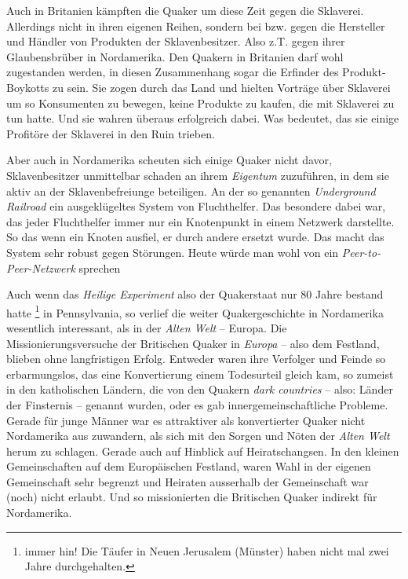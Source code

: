 \medskip

Auch in Britanien kämpften die Quaker um diese Zeit gegen die Sklaverei.
Allerdings nicht in ihren eigenen Reihen, sondern bei bzw. gegen die Hersteller
und Händler von Produkten der Sklavenbesitzer. Also z.T. gegen ihrer
Glaubensbrüber in Nordamerika. Den Quakern in Britanien darf wohl zugestanden
werden, in diesen Zusammenhang sogar die Erfinder des Produkt-Boykotts zu sein.
Sie zogen durch das Land und hielten Vorträge über Sklaverei um so Konsumenten
zu
bewegen, keine Produkte zu kaufen, die mit Sklaverei zu tun hatte. Und sie
wahren überaus erfolgreich dabei. Was bedeutet, das sie einige Profitöre der
Sklaverei in den Ruin trieben.

\medskip

Aber auch in Nordamerika scheuten sich einige Quaker nicht davor,
Sklavenbesitzer unmittelbar schaden an ihrem \textit{Eigentum} zuzuführen, in
dem sie aktiv an der Sklavenbefreiunge beteiligen. An der so genannten
\textit{Underground Railroad} ein ausgeklügeltes System von Fluchthelfer. Das
besondere dabei war, das jeder Fluchthelfer immer nur ein Knotenpunkt in einem
Netzwerk darstellte. So das wenn ein Knoten ausfiel, er durch andere ersetzt
wurde. Das macht das System sehr robust gegen Störungen. Heute würde man wohl
von ein \textit{Peer-to-Peer-Netzwerk} sprechen

\medskip

Auch wenn das \textit{Heilige Experiment} also der Quakerstaat nur 80 Jahre
bestand hatte \footnote{immer hin! Die Täufer in Neuen Jerusalem (Münster) haben
nicht mal zwei Jahre durchgehalten.} in Pennsylvania, so verlief die weiter
Quakergeschichte in Nordamerika wesentlich interessant, als in der \textit{Alten
Welt} -- Europa. Die Missionierungsversuche der Britischen Quaker in
\textit{Europa} -- also dem Festland, blieben ohne langfristigen Erfolg.
Entweder waren ihre Verfolger und Feinde so erbarmungslos, das eine
Konvertierung einem Todesurteil gleich kam, so zumeist in den katholischen
Ländern, die von den Quakern \textit{dark countries} -- also: Länder der
Finsternis -- genannt wurden, oder es gab innergemeinschaftliche Probleme.
Gerade
für junge Männer war es attraktiver als konvertierter Quaker nicht Nordamerika
aus zuwandern, als sich mit den Sorgen und Nöten der \textit{Alten Welt} herum
zu
schlagen. Gerade auch auf Hinblick auf Heiratschangsen. In den kleinen
Gemeinschaften auf dem Europäischen Festland, waren Wahl in der eigenen
Gemeinschaft sehr begrenzt und Heiraten ausserhalb der Gemeinschaft war (noch)
nicht erlaubt. Und so missionierten die Britischen Quaker indirekt für
Nordamerika.

